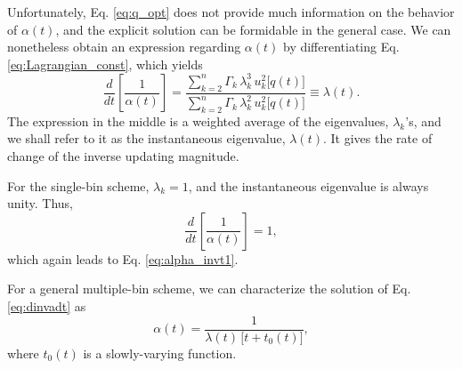 \documentclass[reprint, floatfix]{revtex4-1}
\begin{document}
Unfortunately,
Eq. \eqref{eq:q_opt} does not provide much information
on the behavior of $\alpha(t)$,
and the explicit solution
can be formidable in the general case.
%
We can nonetheless obtain an expression regarding $\alpha(t)$
by differentiating Eq. \eqref{eq:Lagrangian_const},
which yields
%
\begin{equation}
  \frac{ d   }
       { d t }
  \left[
    \frac{       1     }
         { \alpha( t ) }
  \right]
  =
  \frac{
    \sum_{ k = 2 }^n
      \Gamma_k \, \lambda_k^3
      \, u_k^2 \bigl[ q(t) \bigr]
  }
  {
    \sum_{ k = 2 }^n
      \Gamma_k \, \lambda_k^2
      \, u_k^2 \bigl[ q(t) \bigr]
  }
  \equiv
  \lambda(t)
  .
  \label{eq:dinvadt}
\end{equation}
%
The expression in the middle is a weighted average
of the eigenvalues, $\lambda_k$'s,
and we shall refer to it as the instantaneous
eigenvalue, $\lambda(t)$.
%
It gives the rate of change of
the inverse updating magnitude.


For the single-bin scheme, $\lambda_k = 1$,
and the instantaneous eigenvalue is always unity.
Thus,
$$
\frac { d   }
      { d t }
\left[
  \frac{      1    }
       { \alpha(t) }
\right]
=
1,
$$
which again leads to Eq. \eqref{eq:alpha_invt1}.


For a general multiple-bin scheme,
we can characterize the solution of
Eq. \eqref{eq:dinvadt} as
\begin{equation}
  \alpha(t)
  =
  \frac{                  1                     }
       { \lambda(t) \, \bigl[ t + t_0(t) \bigr] }
,
  \label{eq:alpha_approxinvt}
\end{equation}
%
where
$t_0(t)$ is a slowly-varying function.
\end{document}
